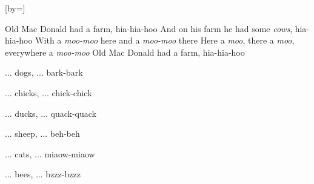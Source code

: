  

[by=]




\beginverse
Old Mac Donald had a farm, hia-hia-hoo
And on his farm he had some \emph{cows}, hia-hia-hoo
With a \emph{moo-moo} here and a \emph{moo-moo} there
Here a \emph{moo}, there a \emph{moo}, everywhere a \emph{moo-moo}
Old Mac Donald had a farm, hia-hia-hoo
\endverse

\beginverse
... dogs, \brk  ... bark-bark 
\endverse

\beginverse
... chicks, \brk  ... chick-chick 
\endverse

\beginverse
... ducks, \brk  ... quack-quack 
\endverse

\beginverse
... sheep, \brk  ... beh-beh 
\endverse

\beginverse
...  cats, \brk  ... miaow-miaow 
\endverse

\beginverse
...  bees, \brk  ... bzzz-bzzz 
\endverse




\endsong
